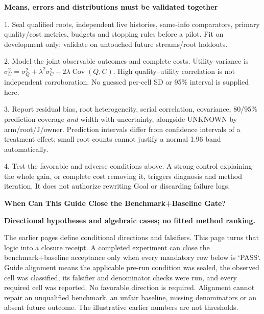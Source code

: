 \documentclass[10pt,a4paper]{article}
\newcommand{\lead}[1]{\vspace{4pt}\textbf{#1}\par}
\newcommand{\caution}{\textcolor{red!70!black}{\textbf{Directional hypotheses and algebraic cases; no fitted method ranking.}}\par}
\begin{document}
\lead{Means, errors and distributions must be validated together}
\small
1. Seal qualified roots, independent live histories, same-info comparators,
primary quality/cost metrics, budgets and stopping rules before a pilot.
Fit on development only; validate on untouched future streams/root holdouts.\par
2. Model the joint observable outcomes and complete costs. Utility variance is
$\sigma_U^2=\sigma_Q^2+\lambda^2\sigma_C^2-2\lambda\operatorname{Cov}(Q,C)$.
High quality--utility correlation is not independent corroboration. No guessed
per-cell SD or 95\% interval is supplied here.\par
3. Report residual bias, root heterogeneity, serial correlation, covariance,
80/95\% prediction coverage \emph{and} width with uncertainty, alongside
UNKNOWN by arm/root/J/owner. Prediction intervals differ from confidence
intervals of a treatment effect; small root counts cannot justify a normal
1.96 band automatically.\par
4. Test the favorable and adverse conditions above. A strong control explaining
the whole gain, or complete cost removing it, triggers diagnosis and method
iteration. It does not authorize rewriting Goal or discarding failure logs.\normalsize

\clearpage
{\large\bfseries When Can This Guide Close the Benchmark+Baseline Gate?}\par\caution
The earlier pages define conditional directions and falsifiers. This page turns
that logic into a closure receipt. A completed experiment can close the
benchmark+baseline acceptance only when every mandatory row below is `PASS`.
Guide alignment means the applicable pre-run condition was sealed, the observed
cell was classified, its falsifier and denominator checks were run, and every
required cell was reported. No favorable direction is required. Alignment cannot
repair an unqualified benchmark, an unfair baseline, missing denominators or an
absent future outcome. The illustrative earlier numbers are not thresholds.
\end{document}
